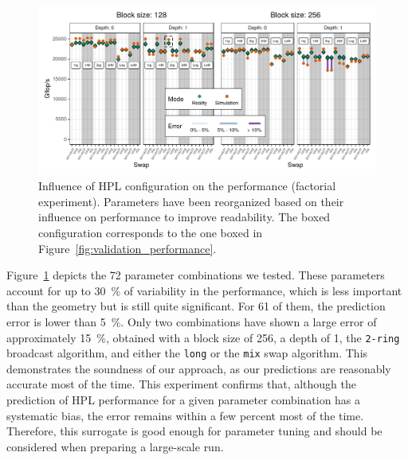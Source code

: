         \begin{figure}[htpb]
            \centering
            \includegraphics[width=\linewidth]{img/prediction/validation/factorial/validation_factorial.pdf}
            \caption{Influence of HPL configuration on the performance (factorial experiment). Parameters have been
                reorganized based on their influence on performance to improve readability. The boxed configuration
                corresponds to the one boxed in Figure~\ref{fig:validation_performance}.
            }
            \label{fig:validation_factorial}
        \end{figure}

        Figure~\ref{fig:validation_factorial} depicts the 72 parameter combinations we tested. These parameters account
        for up to \SI{30}{\percent} of variability in the performance, which is less important than the geometry but is
        still quite significant. For 61 of them, the prediction error is lower than \SI{5}{\percent}. Only two
        combinations have shown a large error of approximately \SI{15}{\percent}, obtained with a block size of 256, a
        depth of 1, the \texttt{2-ring} broadcast algorithm, and either the \texttt{long} or the \texttt{mix} swap
        algorithm. This demonstrates the soundness of our approach, as our predictions are reasonably accurate most of
        the time.  This experiment confirms that, although the prediction of HPL performance for a given parameter
        combination has a systematic bias, the error remains within a few percent most of the time. Therefore, this
        surrogate is good enough for parameter tuning and should be considered when preparing a large-scale run.

